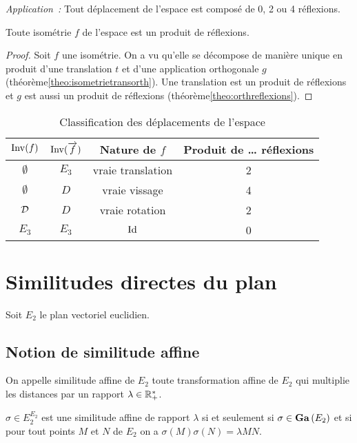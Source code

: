 \emph{Application~:} Tout déplacement de l'espace est composé de 0, 2 ou 4 
réflexions.

\begin{cor}
  Toute isométrie \(f\) de l'espace est un produit de réflexions.
\end{cor}
\begin{proof}
  Soit \(f\) une isométrie. On a vu qu'elle se décompose de manière unique en 
  produit d'une translation \(t\) et d'une application orthogonale \(g\) 
  (théorème\ref{theo:isometrietransorth}). Une translation est un produit de réflexions 
  et \(g\) est aussi un produit de réflexions (théorème\ref{theo:orthreflexions}).
\end{proof}

\begin{table}
  \centering
  \begin{tabular}{|c|c|c|c|}\hline
    \(\operatorname{Inv}(f)\) & \(\operatorname{Inv}(\overrightarrow{f})\) & Nature de \(f\) & Produit de \ldots 
    réflexions \\ \hline
    \(\emptyset\) & \(E_3\) & vraie translation & 2 \\
    \(\emptyset\) & \(D\) & vraie vissage & 4 \\
    \(\mathcal{D}\) & \(D\)& vraie rotation & 2 \\
    \(E_3\) & \(E_3\) & \(\operatorname{Id}\) & 0 \\ \hline
  \end{tabular}
  \caption{Classification des déplacements de l'espace}
  \label{tab:classdéplacementsespace}
\end{table}

\section{Similitudes directes du plan}

Soit \(E_2\) le plan vectoriel euclidien.

\subsection{Notion de similitude affine}

\begin{defdef}
  On appelle similitude affine de \(E_2\) toute transformation affine de \(E_2\) 
  qui multiplie les distances par un rapport \(\lambda \in \mathbb{R}_{+}^{*}\).

  \(\sigma \in E_2^{E_2}\) est une similitude affine de rapport \(\lambda\) si 
  et seulement si \(\sigma \in \mathbf{Ga}\left(E_2\right)\) et si pour tout points \(M\) et \(N\) 
  de \(E_2\) on a \(\sigma(M)\sigma(N)=\lambda MN\).
\end{defdef}


